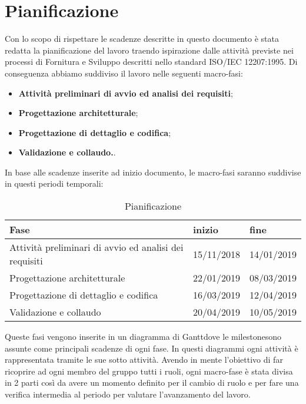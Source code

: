 \section{Pianificazione}

Con lo scopo di rispettare le scadenze descritte in questo documento è stata redatta la pianificazione del lavoro traendo ispirazione dalle attività previste nei processi di Fornitura e Sviluppo descritti nello standard ISO/IEC 12207:1995. Di conseguenza abbiamo suddiviso il lavoro nelle seguenti macro-fasi:
\begin{itemize}
	\item{\textbf{Attività preliminari di avvio ed analisi dei requisiti}};
	\item{\textbf{Progettazione architetturale}};
	\item{\textbf{Progettazione di dettaglio e codifica}};
	\item{\textbf{Validazione e collaudo.}}.
\end{itemize} 
In base alle scadenze inserite ad inizio documento, le macro-fasi saranno suddivise in questi periodi temporali:
\newline
\begin{table}[!htpb]
	\centering
	\renewcommand{\arraystretch}{2} 
	\begin{tabular}{|l|l|l|}
		\hline
		\rowcolor{orange!50}
		\textbf{Fase} & \textbf{inizio} & \textbf{fine}\\
		\hline
		Attività preliminari di avvio ed analisi dei requisiti & 15/11/2018 & 14/01/2019 \\
		\hline
		Progettazione architetturale & 22/01/2019 & 08/03/2019\\
		\hline
		Progettazione di dettaglio e codifica & 16/03/2019 & 12/04/2019\\
		\hline
		Validazione e collaudo & 20/04/2019 & 10/05/2019\\
		\hline
	\end{tabular}
	\caption{Pianificazione}
\end{table}
\newline Queste fasi vengono inserite in un diagramma di Gantt\pedice dove le milestone\pedice sono assunte come principali scadenze di ogni fase. In questi diagrammi ogni attività è rappresentata tramite le sue sotto attività.
\newline Avendo in mente l'obiettivo di far ricoprire ad ogni membro del gruppo tutti i ruoli, ogni macro-fase è stata divisa in 2 parti così da avere un momento definito per il cambio di ruolo e per fare una verifica intermedia al periodo per valutare l'avanzamento del lavoro. 


\clearpage

\clearpage

\clearpage

\clearpage
